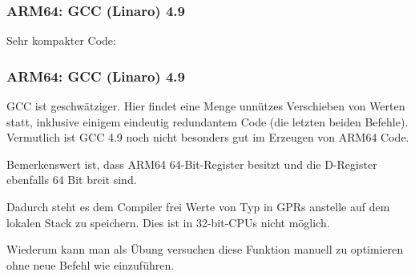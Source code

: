 \subsubsection{ARM64: \Optimizing GCC (Linaro) 4.9}

Sehr kompakter Code:



\subsubsection{ARM64: \NonOptimizing GCC (Linaro) 4.9}



\NonOptimizing GCC ist geschwätziger.
Hier findet eine Menge unnützes Verschieben von Werten statt, inklusive einigem
eindeutig redundantem Code (die letzten beiden  Befehle). Vermutlich
ist GCC 4.9 noch nicht besonders gut im Erzeugen von ARM64 Code.

Bemerkenswert ist, dass ARM64 64-Bit-Register besitzt und die D-Register
ebenfalls 64 Bit breit sind.

Dadurch steht es dem Compiler frei Werte von Typ \Tdouble in \ac{GPR}s anstelle
auf dem lokalen Stack zu speichern. Dies ist in 32-bit-CPUs nicht möglich.

Wiederum kann man als Übung versuchen diese Funktion manuell zu optimieren ohne
neue Befehl wie  einzuführen. 
